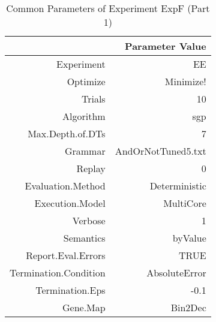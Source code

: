 \begin{table}[ht]
\centering
\begin{tabular}{rr}
  \hline
 & Parameter Value \\ 
  \hline
Experiment & EE \\ 
  Optimize & Minimize! \\ 
  Trials & 10 \\ 
  Algorithm & sgp \\ 
  Max.Depth.of.DTs & 7 \\ 
  Grammar & AndOrNotTuned5.txt \\ 
  Replay & 0 \\ 
  Evaluation.Method & Deterministic \\ 
  Execution.Model & MultiCore \\ 
  Verbose & 1 \\ 
  Semantics & byValue \\ 
  Report.Eval.Errors & TRUE \\ 
  Termination.Condition & AbsoluteError \\ 
  Termination.Eps & -0.1 \\ 
  Gene.Map & Bin2Dec \\ 
   \hline
\end{tabular}
\caption{Common Parameters of Experiment ExpF (Part 1)} 
\end{table}
